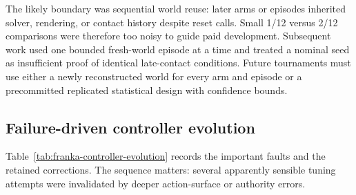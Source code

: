 The likely boundary was sequential world reuse: later arms or episodes
inherited solver, rendering, or contact history despite reset calls.  Small
1/12 versus 2/12 comparisons were therefore too noisy to guide paid
development.  Subsequent work used one bounded fresh-world episode at a time
and treated a nominal seed as insufficient proof of identical late-contact
conditions.  Future tournaments must use either a newly reconstructed world
for every arm and episode or a precommitted replicated statistical design with
confidence bounds.

\subsection{Failure-driven controller evolution}

Table~\ref{tab:franka-controller-evolution} records the important faults and
the retained corrections.  The sequence matters: several apparently sensible
tuning attempts were invalidated by deeper action-surface or authority errors.

